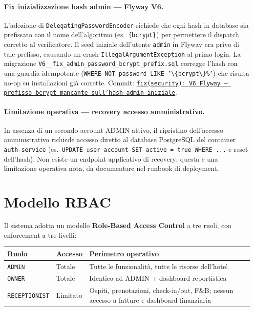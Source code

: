 ﻿\documentclass[a4paper,12pt]{report}
\newcommand{\commitref}[2]{\texttt{\small \href{https://github.com/diegoandruccioli/hotel-pms/commit/#1}{#2}}}
\begin{document}
\paragraph{Fix inizializzazione hash admin — Flyway V6.}
L'adozione di \texttt{DelegatingPasswordEncoder} richiede che ogni hash in database
sia prefissato con il nome dell'algoritmo (es.\ \texttt{\{bcrypt\}}) per permettere
il dispatch corretto al verificatore.
Il seed iniziale dell'utente \texttt{admin} in Flyway era privo di tale prefisso,
causando un crash \texttt{IllegalArgumentException} al primo login.
La migrazione \texttt{V6\_\_fix\_admin\_password\_bcrypt\_prefix.sql} corregge
l'hash con una guardia idempotente
(\texttt{WHERE NOT password LIKE '\textbackslash\{bcrypt\textbackslash\}\%'})
che risulta no-op su installazioni già corrette.
Commit: \commitref{953be80}{fix(security): V6 Flyway --- prefisso bcrypt mancante sull'hash admin iniziale}.

\paragraph{Limitazione operativa — recovery accesso amministrativo.}
In assenza di un secondo account ADMIN attivo, il ripristino dell'accesso
amministrativo richiede accesso diretto al database PostgreSQL del container
\texttt{auth-service} (es.\ \texttt{UPDATE user\_account SET active = true WHERE ...}
e reset dell'hash). Non esiste un endpoint applicativo di recovery:
questa è una limitazione operativa nota, da documentare nel runbook di deployment.

\section{Modello RBAC}

Il sistema adotta un modello \textbf{Role-Based Access Control} a tre ruoli,
con enforcement a tre livelli:

\begin{center}
\small
\begin{tabular}{llp{7cm}}
\toprule
\textbf{Ruolo} & \textbf{Accesso} & \textbf{Perimetro operativo} \\
\midrule
\texttt{ADMIN}       & Totale & Tutte le funzionalità, tutte le risorse dell'hotel \\
\texttt{OWNER}       & Totale & Identico ad ADMIN + dashboard reportistica \\
\texttt{RECEPTIONIST}& Limitato & Ospiti, prenotazioni, check-in/out, F\&B;
                                  nessun accesso a fatture e dashboard finanziaria \\
\bottomrule
\end{tabular}
\end{center}
\end{document}
